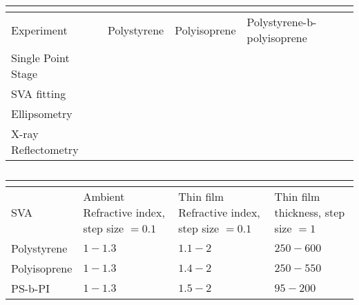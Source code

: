 \documentclass[MasterThesisMain.tex]{subfiles}
\begin{document}
\begin{table}
	\caption{}
\begin{tabular}{ |p{4cm}||p{3cm}|p{3cm}|p{3cm}| }
 \hline
 \multicolumn{4}{|c|}{} \\
 \hline
 Experiment & Polystyrene & Polyisoprene & Polystyrene-b-polyisoprene\\
 \hline
 Single Point Stage & & & \\
 SVA fitting & & & \\
 Ellipsometry & & & \\  
 \hline
 X-ray Reflectometry & & & \\
 \hline
\end{tabular}
\label{}
\end{table}

\begin{table}
	\caption{}
\begin{tabular}{ |p{4cm}||p{3cm}|p{3cm}|p{3cm}| }
 \hline
 \multicolumn{4}{|c|}{} \\
 \hline
 SVA & Ambient Refractive index, step size $=0.1$ & Thin film Refractive index, step size $=0.1$ & Thin film thickness, step size $=1$\\
 \hline
Polystyrene & $1-1.3$ & $1.1-2$ & $250-600$ \\
Polyisoprene & $1-1.3$ & $1.4-2$ & $250-550$ \\
PS-b-PI & $1-1.3$ & $1.5-2$ & $95-200$ \\ 
\hline 
\end{tabular}
\label{}
\end{table}
\end{document}
